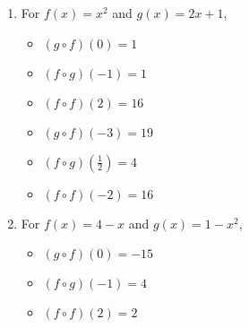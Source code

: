 \begin{enumerate}

\item  For  $f(x) = x^2$ and $g(x) = 2x+1$,
\begin{multicols}{3}

\begin{itemize}

\item  $(g\circ f)(0) = 1$

\item  $(f\circ g)(-1) = 1$

\item  $(f \circ f)(2) = 16$

\end{itemize}

\end{multicols}

\begin{multicols}{3}

\begin{itemize}

\item  $(g\circ f)(-3) = 19$

\item  $(f\circ g)\left(\frac{1}{2}\right) = 4$

\item  $(f \circ f)(-2) = 16$

\end{itemize}

\end{multicols}

\item  For   $f(x) = 4-x$ and $g(x) = 1-x^2$,
\begin{multicols}{3}

\begin{itemize}

\item  $(g\circ f)(0) = -15$

\item  $(f\circ g)(-1) = 4$

\item  $(f \circ f)(2) = 2$

\end{itemize}

\end{multicols}

\begin{multicols}{3}

\begin{itemize}


\end{itemize}
\end{multicols}
\end{enumerate}
